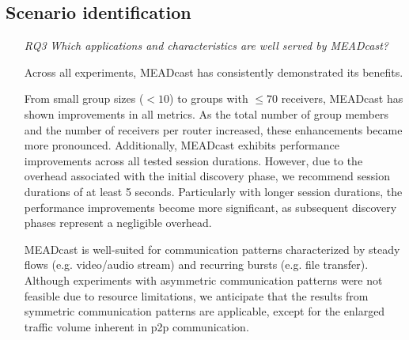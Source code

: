 
\subsection{Scenario identification} %
\label{sub:discussion_scenario}
\begin{itemize}
\item[\textit{RQ3}]
    \textit{Which applications and characteristics are well served by MEADcast?}

    Across all experiments, MEADcast has consistently demonstrated its
        benefits.

    From small group sizes ($<10$) to groups with $\leq 70$ receivers, MEADcast
        has shown improvements in all metrics.
    As the total number of group members and the number of receivers per
        router increased, these enhancements became more pronounced.
    Additionally, MEADcast exhibits performance improvements across all tested
        session durations.
    However, due to the overhead associated with the initial discovery phase,
        we recommend session durations of at least 5 seconds.
    Particularly with longer session durations, the performance improvements
        become more significant, as subsequent discovery phases represent a
        negligible overhead.

    MEADcast is well-suited for communication patterns characterized by steady
        flows (e.g. video/audio stream) and recurring bursts (e.g. file
        transfer).
    Although experiments with asymmetric communication patterns were not
        feasible due to resource limitations, we anticipate that the results
        from symmetric communication patterns are applicable, except for the
        enlarged traffic volume inherent in \gls{p2p} communication.


\end{itemize}
